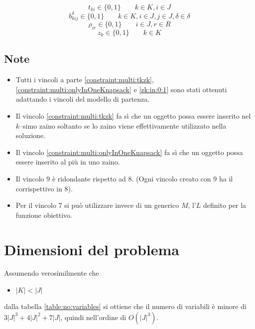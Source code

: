 \documentclass{scrartcl}
\begin{document}
\begin{equation}
t_{ki} \in \{0,1\} \quad \quad k \in K, i \in J
\end{equation}
\begin{equation}
b_{kij}^\delta \in \{0,1\} \quad \quad k \in K, i \in J, j \in J, \delta \in \delta
\end{equation}
\begin{equation}
\rho_{ir} \in \{0,1\} \quad\quad i \in J, r \in R
\end{equation}
\begin{equation}
\label{zk:in:0:1}
z_k \in \{0,1\} \quad \quad k \in K
\end{equation}

\subsection{Note}
\begin{itemize}
\item Tutti i vincoli a parte \ref{constraint:multi:tkzk}, \ref{constraint:multi:onlyInOneKnapsack} e \ref{zk:in:0:1} sono stati ottenuti adattando i vincoli del modello di partenza.
\item Il vincolo \ref{constraint:multi:tkzk} fa sì che un oggetto possa essere inserito nel $k$--simo zaino soltanto se lo zaino viene effettivamente utilizzato nella soluzione.
\item Il vincolo \ref{constraint:multi:onlyInOneKnapsack} fa sì che un oggetto possa essere inserito al più in uno zaino. 
\item Il vincolo 9 è ridondante rispetto ad 8. (Ogni vincolo creato con 9 ha il corrispettivo in 8).
\item Per il vincolo 7 si può utilizzare invece di un generico $M$, l'$L$ definito per la funzione obiettivo.
\end{itemize}

\section{Dimensioni del problema}
Assumendo verosimilmente che 
\begin{itemize}
	\item $|K| < |J|$
\end{itemize}  
dalla tabella \ref{table:no:variables}
si ottiene che il numero di variabili è minore di $3|J|^3 + 4|J|^2 + 7|J|$, quindi
nell'ordine di $O(|J|^3)$.
\end{document}
